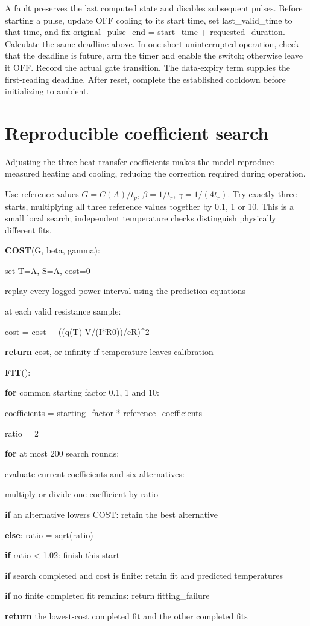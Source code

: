 \documentclass[11pt,letterpaper]{article}
\newenvironment{pseudocode}{\par\begingroup\small\setlength{\parskip}{0.15em}}{\endgroup\par}
\newcommand{\pcstep}[2]{\par\noindent\hspace*{#1em}\parbox[t]{\dimexpr\linewidth-#1em\relax}{\raggedright #2\strut}}
\begin{document}
A fault preserves the last computed state and disables subsequent pulses. Before starting a pulse, update OFF cooling to its start time, set \textsf{last\_\allowbreak{}valid\_\allowbreak{}time} to that time, and fix \textsf{original\_\allowbreak{}pulse\_\allowbreak{}end = start\_\allowbreak{}time + requested\_\allowbreak{}duration}. Calculate the same deadline above. In one short uninterrupted operation, check that the deadline is future, arm the timer and enable the switch; otherwise leave it OFF. Record the actual gate transition. The data-expiry term supplies the first-reading deadline. After reset, complete the established cooldown before initializing to ambient.

\section{Reproducible coefficient search}

Adjusting the three heat-transfer coefficients makes the model reproduce measured heating and cooling, reducing the correction required during operation.

Use reference values \(G=C(A)/t_p\), \(\beta=1/t_r\), \(\gamma=1/(4t_r)\). Try exactly three starts, multiplying all three reference values together by 0.1, 1 or 10. This is a small local search; independent temperature checks distinguish physically different fits.

\begin{pseudocode}
\pcstep{0.0}{\textbf{COST}(G, beta, gamma):}
\pcstep{1.0}{set T=A, S=A, cost=0}
\pcstep{1.0}{replay every logged power interval using the prediction equations}
\pcstep{1.0}{at each valid resistance sample:}
\pcstep{2.0}{cost = cost + ((q(T)-V/(I*R0))/eR)\textasciicircum{}2}
\pcstep{1.0}{\textbf{return} cost, or infinity if temperature leaves calibration}
\par\vspace{0.35em}
\pcstep{0.0}{\textbf{FIT}():}
\pcstep{1.0}{\textbf{for} common starting factor 0.1, 1 and 10:}
\pcstep{2.0}{coefficients = starting\_\allowbreak{}factor * reference\_\allowbreak{}coefficients}
\pcstep{2.0}{ratio = 2}
\pcstep{2.0}{\textbf{for} at most 200 search rounds:}
\pcstep{3.0}{evaluate current coefficients and six alternatives:}
\pcstep{4.0}{multiply or divide one coefficient by ratio}
\pcstep{3.0}{\textbf{if} an alternative lowers COST: retain the best alternative}
\pcstep{3.0}{\textbf{else}: ratio = sqrt(ratio)}
\pcstep{3.0}{\textbf{if} ratio < 1.02: finish this start}
\pcstep{2.0}{\textbf{if} search completed and cost is finite: retain fit and predicted temperatures}
\pcstep{1.0}{\textbf{if} no finite completed fit remains: return fitting\_\allowbreak{}failure}
\pcstep{1.0}{\textbf{return} the lowest-cost completed fit and the other completed fits}
\end{pseudocode}
\end{document}
